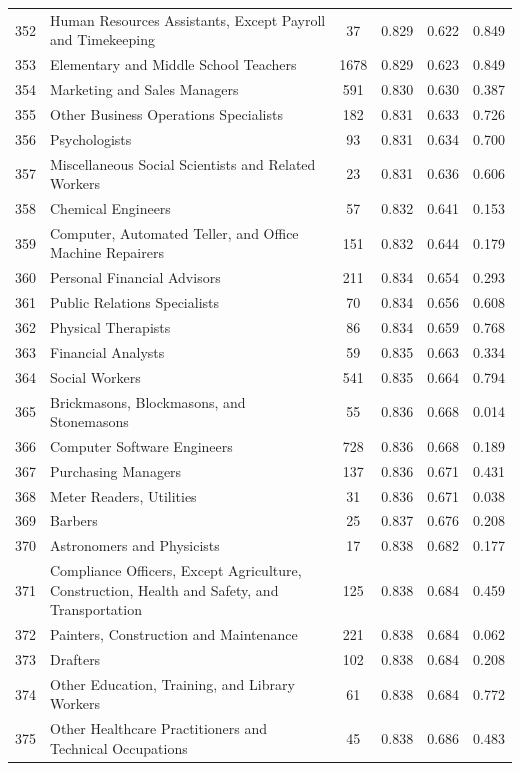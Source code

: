 {\begin{longtable}{llcccc}
 352 & Human Resources Assistants, Except Payroll and Timekeeping & 37 & 0.829 & 0.622 & 0.849 \\
 353 & Elementary and Middle School Teachers & 1678 & 0.829 & 0.623 & 0.849 \\
 354 & Marketing and Sales Managers & 591 & 0.830 & 0.630 & 0.387 \\
 355 & Other Business Operations Specialists & 182 & 0.831 & 0.633 & 0.726 \\
 356 & Psychologists & 93 & 0.831 & 0.634 & 0.700 \\
 357 & Miscellaneous Social Scientists and Related Workers & 23 & 0.831 & 0.636 & 0.606 \\
 358 & Chemical Engineers & 57 & 0.832 & 0.641 & 0.153 \\
 359 & Computer, Automated Teller, and Office Machine Repairers & 151 & 0.832 & 0.644 & 0.179 \\
 360 & Personal Financial Advisors & 211 & 0.834 & 0.654 & 0.293 \\
 361 & Public Relations Specialists & 70 & 0.834 & 0.656 & 0.608 \\
 362 & Physical Therapists & 86 & 0.834 & 0.659 & 0.768 \\
 363 & Financial Analysts & 59 & 0.835 & 0.663 & 0.334 \\
 364 & Social Workers & 541 & 0.835 & 0.664 & 0.794 \\
 365 & Brickmasons, Blockmasons, and Stonemasons & 55 & 0.836 & 0.668 & 0.014 \\
 366 & Computer Software Engineers & 728 & 0.836 & 0.668 & 0.189 \\
 367 & Purchasing Managers & 137 & 0.836 & 0.671 & 0.431 \\
 368 & Meter Readers, Utilities & 31 & 0.836 & 0.671 & 0.038 \\
 369 & Barbers & 25 & 0.837 & 0.676 & 0.208 \\
 370 & Astronomers and Physicists & 17 & 0.838 & 0.682 & 0.177 \\
 371 & Compliance Officers, Except Agriculture, Construction, Health and Safety, and Transportation & 125 & 0.838 & 0.684 & 0.459 \\
 372 & Painters, Construction and Maintenance & 221 & 0.838 & 0.684 & 0.062 \\
 373 & Drafters & 102 & 0.838 & 0.684 & 0.208 \\
 374 & Other Education, Training, and Library Workers & 61 & 0.838 & 0.684 & 0.772 \\
 375 & Other Healthcare Practitioners and Technical Occupations & 45 & 0.838 & 0.686 & 0.483 \\

\end{longtable}}
